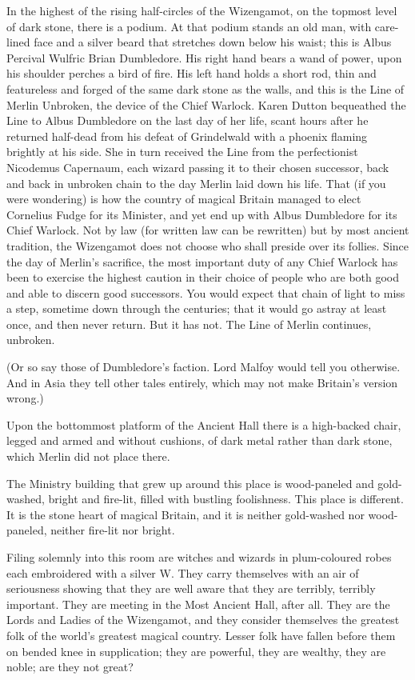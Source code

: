 In the highest of the rising half-circles of the Wizengamot, on the topmost
level of dark stone, there is a podium. At that podium stands an old man, with
care-lined face and a silver beard that stretches down below his waist; this is
Albus Percival Wulfric Brian Dumbledore. His right hand bears a wand of power,
upon his shoulder perches a bird of fire. His left hand holds a short rod, thin
and featureless and forged of the same dark stone as the walls, and this is the
Line of Merlin Unbroken, the device of the Chief Warlock. Karen Dutton
bequeathed the Line to Albus Dumbledore on the last day of her life, scant
hours after he returned half-dead from his defeat of Grindelwald with a phoenix
flaming brightly at his side. She in turn received the Line from the
perfectionist Nicodemus Capernaum, each wizard passing it to their chosen
successor, back and back in unbroken chain to the day Merlin laid down his
life. That (if you were wondering) is how the country of magical Britain
managed to elect Cornelius Fudge for its Minister, and yet end up with Albus
Dumbledore for its Chief Warlock. Not by law (for written law can be rewritten)
but by most ancient tradition, the Wizengamot does not choose who shall preside
over its follies. Since the day of Merlin's sacrifice, the most important duty
of any Chief Warlock has been to exercise the highest caution in their choice
of people who are both good and able to discern good successors. You would
expect that chain of light to miss a step, sometime down through the centuries;
that it would go astray at least once, and then never return. But it has not.
The Line of Merlin continues, unbroken.

(Or so say those of Dumbledore's faction. Lord Malfoy would tell you otherwise.
And in Asia they tell other tales entirely, which may not make Britain's
version wrong.)

Upon the bottommost platform of the Ancient Hall there is a high-backed chair,
legged and armed and without cushions, of dark metal rather than dark stone,
which Merlin did not place there.

The Ministry building that grew up around this place is wood-paneled and
gold-washed, bright and fire-lit, filled with bustling foolishness. This place
is different. It is the stone heart of magical Britain, and it is neither
gold-washed nor wood-paneled, neither fire-lit nor bright.

Filing solemnly into this room are witches and wizards in plum-coloured robes
each embroidered with a silver W\@. They carry themselves with an air of
seriousness showing that they are well aware that they are terribly, terribly
important. They are meeting in the Most Ancient Hall, after all. They are the
Lords and Ladies of the Wizengamot, and they consider themselves the greatest
folk of the world's greatest magical country. Lesser folk have fallen before
them on bended knee in supplication; they are powerful, they are wealthy, they
are noble; are they not great?

